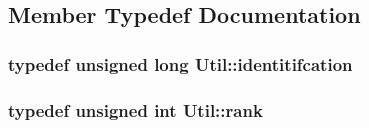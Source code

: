 \subsection{Member Typedef Documentation}
\hypertarget{class_util_ad17d458d9344b10bba64347e514d6d71}{
\subsubsection[{identitifcation}]{\setlength{\rightskip}{0pt plus 5cm}typedef unsigned long {\bf Util\-::identitifcation}}}\label{class_util_ad17d458d9344b10bba64347e514d6d71}
\hypertarget{class_util_a2a402b3a3a889d699bb3a1a87cbe6d1e}{
\subsubsection[{rank}]{\setlength{\rightskip}{0pt plus 5cm}typedef unsigned int {\bf Util\-::rank}}}\label{class_util_a2a402b3a3a889d699bb3a1a87cbe6d1e}


